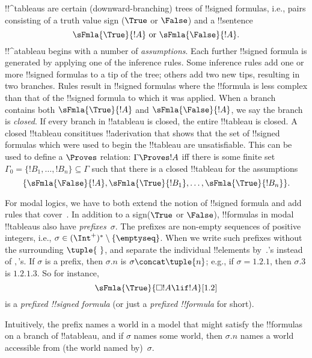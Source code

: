 \documentclass[../../../include/open-logic-section]{subfiles}
\begin{document}


!!^{tableau}s are certain (downward-branching) trees of !!{signed
  formula}s, i.e., pairs consisting of a truth value sign ($\True$ or
$\False$) and a !!{sentence}
\[
\sFmla{\True}{!A} \text{ or } \sFmla{\False}{!A}.
\]
!!^a{tableau} begins with a number of \emph{assumptions}. Each further
!!{signed formula} is generated by applying one of the inference
rules. Some inference rules add one or more !!{signed formula}s to a
tip of the tree; others add two new tips, resulting in two branches.
Rules result in !!{signed formula}s where the !!{formula} is
less complex than that of the !!{signed formula} to which it was
applied. When a branch contains both $\sFmla{\True}{!A}$ and
$\sFmla{\False}{!A}$, we say the branch is \emph{closed}. If every
branch in !!a{tableau} is closed, the entire !!{tableau} is closed. A
closed !!{tableau} consititues !!a{derivation} that shows that the set
of !!{signed formula}s which were used to begin the !!{tableau} are
unsatisfiable.  This can be used to define a $\Proves$ relation:
$\Gamma \Proves !A$ iff there is some finite set~$\Gamma_0 = \{!B_1,
\dots, !B_n\} \subseteq \Gamma$ such that there is a closed
!!{tableau} for the assumptions
\[
\{\sFmla{\False}{!A}, \sFmla{\True}{!B_1}, \dots, \sFmla{\True}{!B_n}\}.
\]

For modal logics, we have to both extend the notion of !!{signed
formula} and add rules that
cover~. In addition to a sign($\True$ or
$\False$), !!{formula}s in modal !!{tableau}s also have
\emph{prefixes}~$\sigma$. The prefixes are non-empty sequences of
positive integers, i.e., $\sigma \in (\Int^+)^* \setminus
\{\emptyseq\}$. When we write such prefixes without the surrounding
$\tuple{\ }$, and separate the individual !!{element}s by~$.$'s
instead of $,$'s. If $\sigma$ is a prefix, then $\sigma.n$ is $\sigma
\concat \tuple{n}$; e.g., if $\sigma = 1.2.1$, then $\sigma.3$ is
$1.2.1.3$. So for instance,
\[
\sFmla{\True}{\Box !A \lif !A}[1.2]
\]
is a \emph{prefixed !!{signed formula}} (or just a \emph{prefixed
  !!{formula}} for short).

Intuitively, the prefix names a world in a model that might satisfy
the !!{formula}s on a branch of !!a{tableau}, and if $\sigma$ names
some world, then $\sigma.n$ names a world accessible from (the world
named by)~$\sigma$.
\end{document}
